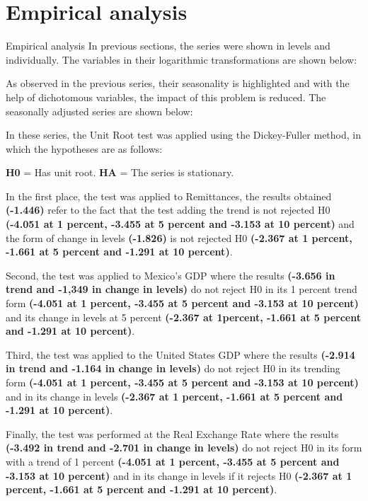 \section{Empirical analysis}
    \begin{frame}{Empirical analysis}
In previous sections, the series were shown in levels and individually. The variables in their logarithmic transformations are shown below:\par
As observed in the previous series, their seasonality is highlighted and with the help of dichotomous variables, the impact of this problem is reduced. The seasonally adjusted  
series are shown below:\par
In these series, the Unit Root test was applied using the Dickey-Fuller method, in which the hypotheses are as follows:\par
\begin{center}
\textbf{H0} = Has unit root.
\textbf{HA} = The series is stationary.
\end{center}
In the first place, the test was applied to Remittances, the results obtained \textbf{(-1.446)} refer to the fact that the test adding the trend is not rejected H0 \textbf{(-4.051 at 1 percent, -3.455 at 5 percent and -3.153 at 10 percent)} and the form of change in levels \textbf{(-1.826)} is not rejected H0 \textbf{(-2.367 at 1 percent, -1.661 at 5 percent and -1.291 at 10 percent)}. \par
Second, the test was applied to Mexico's GDP where the results \textbf{(-3.656 in trend and -1,349 in change in levels)} do not reject H0 in its 1 percent trend form \textbf{(-4.051 at 1 percent, -3.455 at 5 percent and -3.153 at 10 percent)} and its change in levels at 5 percent \textbf{(-2.367 at 1percent, -1.661 at 5 percent and -1.291 at 10 percent)}.\par
Third, the test was applied to the United States GDP where the results \textbf{(-2.914 in trend and -1.164 in change in levels)} do not reject H0 in its trending form \textbf{(-4.051 at 1 percent, -3.455 at 5 percent and -3.153 at 10 percent)} and in its change in levels \textbf{(-2.367 at 1 percent, -1.661 at 5 percent and -1.291 at 10 percent)}.\par 
Finally, the test was performed at the Real Exchange Rate where the results \textbf{(-3.492 in trend and -2.701 in change in levels)} do not reject H0 in its form with a trend of 1 percent \textbf{(-4.051 at 1 percent, -3.455 at 5 percent and -3.153 at 10 percent)} and in its change in levels if it rejects H0 \textbf{(-2.367 at 1 percent, -1.661 at 5 percent and -1.291 at 10 percent)}.\par

\end{frame}
